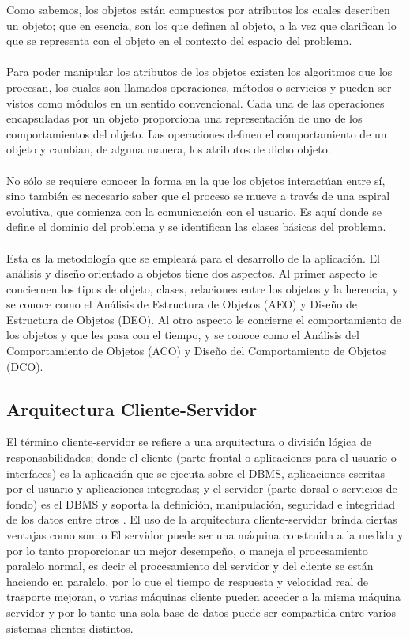 \documentclass[10pt,a4paper]{article}
\begin{document}
Como sabemos, los objetos est\'an compuestos por atributos los cuales describen un objeto; que en esencia, son los que definen al objeto, a la vez que clarifican lo que se representa con el objeto en el contexto del espacio del problema.
\\
\\
Para poder manipular los atributos de los objetos existen los algoritmos que los procesan, los cuales son llamados operaciones, m\'etodos o servicios y pueden ser vistos como m\'odulos en un sentido convencional. Cada una de las operaciones encapsuladas por un objeto proporciona una representaci\'on de uno de los comportamientos del objeto. Las operaciones definen el comportamiento de un objeto y cambian, de alguna manera, los atributos de dicho objeto.
\\
\\
No s\'olo se requiere conocer la forma en la que los objetos interact\'uan entre s\'i, sino tambi\'en es necesario saber que el proceso se mueve a trav\'es de una espiral evolutiva, que comienza con la comunicaci\'on con el usuario. Es aqu\'i donde se define el dominio del problema y se identifican las clases b\'asicas del problema.
\\
\\
Esta es la metodolog\'ia que se emplear\'a para el desarrollo de la aplicaci\'on. El an\'alisis y dise\~no orientado a objetos tiene dos aspectos. Al primer aspecto le conciernen los tipos de objeto, clases, relaciones entre los objetos y la herencia, y se conoce como el An\'alisis de Estructura de Objetos (AEO) y Diseño de Estructura de Objetos (DEO). Al otro aspecto le concierne el comportamiento de los objetos y que les pasa con el tiempo, y se conoce como el An\'alisis del Comportamiento de Objetos (ACO) y Diseño del Comportamiento de Objetos (DCO)\cite{schneider1992}.

\subsection{Arquitectura Cliente-Servidor}

El t\'ermino cliente-servidor se refiere a una arquitectura o divisi\'on l\'ogica de responsabilidades; donde el cliente (parte frontal o aplicaciones para el usuario o interfaces) es la aplicaci\'on que se ejecuta sobre el DBMS, aplicaciones escritas por el usuario y aplicaciones integradas; y el servidor (parte dorsal o servicios de fondo) es el DBMS y soporta la definici\'on, manipulaci\'on, seguridad e integridad de los datos entre otros \cite{crnkovic2001}.
El uso de la arquitectura cliente-servidor brinda ciertas ventajas como son: o El servidor puede ser una m\'aquina construida a la medida y por lo tanto proporcionar un mejor desempe\~no, o maneja el procesamiento paralelo normal, es decir el procesamiento del servidor y del cliente se est\'an haciendo en paralelo, por lo que el tiempo de respuesta y velocidad real de trasporte mejoran, o varias m\'aquinas cliente pueden acceder a la misma m\'aquina servidor y por lo tanto una sola base de datos puede ser compartida entre varios sistemas clientes distintos.
\end{document}
